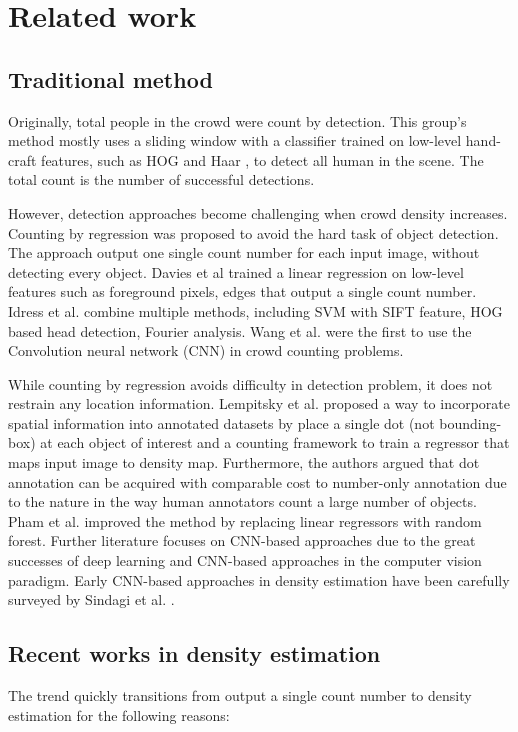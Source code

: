 \section{Related work} \label{sec:related}
\subsection{Traditional method}
Originally, total people in the crowd were count by detection. This group's method mostly uses a sliding window with a classifier trained on low-level hand-craft features, such as HOG \cite{dalal2005histograms}  and Haar \cite{lin2001estimation}, to detect all human in the scene. The total count is the number of successful detections.

However, detection approaches become challenging when crowd density increases. Counting by regression was proposed to avoid the hard task of object detection. The approach output one single count number for each input image, without detecting every object. Davies et al \cite{davies1995crowd} trained a linear regression on low-level features such as foreground pixels, edges that output a single count number. Idress et al. \cite{idrees2013multi} combine multiple methods, including SVM with SIFT feature, HOG based head detection, Fourier analysis. Wang et al. \cite{wang2015deep} were the first to use the Convolution neural network (CNN) in crowd counting problems.

While counting by regression avoids difficulty in detection problem, it does not restrain any location information. Lempitsky et al. \cite{lempitsky2010learning} proposed a way to incorporate spatial information into annotated datasets by place a single dot (not bounding-box) at each object of interest and a counting framework to train a regressor that maps input image to density map. Furthermore, the authors argued that dot annotation can be acquired with comparable cost to number-only annotation due to the nature in the way human annotators count a large number of objects. Pham et al. \cite{7410729} improved the method by replacing linear regressors with random forest. Further literature focuses on CNN-based approaches due to the great successes of deep learning and CNN-based approaches in the computer vision paradigm. Early CNN-based approaches in density estimation have been carefully surveyed by Sindagi et al. \cite{SINDAGI20183}.

\subsection{Recent works in density estimation}
The trend quickly transitions from output a single count number to density estimation for the following reasons: 



